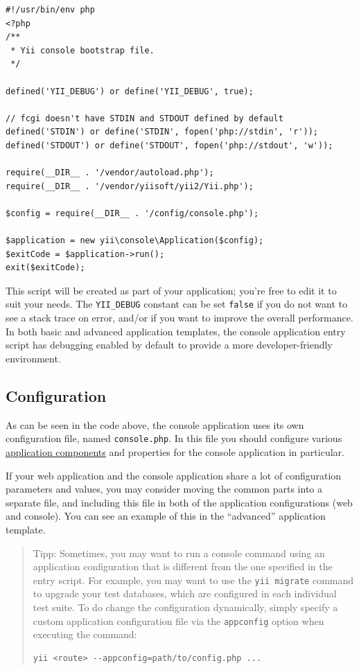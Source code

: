 \lstset{language=php}\begin{lstlisting}
#!/usr/bin/env php
<?php
/**
 * Yii console bootstrap file.
 */

defined('YII_DEBUG') or define('YII_DEBUG', true);

// fcgi doesn't have STDIN and STDOUT defined by default
defined('STDIN') or define('STDIN', fopen('php://stdin', 'r'));
defined('STDOUT') or define('STDOUT', fopen('php://stdout', 'w'));

require(__DIR__ . '/vendor/autoload.php');
require(__DIR__ . '/vendor/yiisoft/yii2/Yii.php');

$config = require(__DIR__ . '/config/console.php');

$application = new yii\console\Application($config);
$exitCode = $application->run();
exit($exitCode);
\end{lstlisting}
This script will be created as part of your application; you're free to edit it to suit your needs. The \lstinline|YII_DEBUG| constant can be set \lstinline|false| if you do
not want to see a stack trace on error, and/or if you want to improve the overall performance. In both basic and advanced application
templates, the console application entry script has debugging enabled by default to provide a more developer-friendly environment.

\subsection{Configuration \label{tutorial-console.md::configuration}}
As can be seen in the code above, the console application uses its own configuration file, named \lstinline|console.php|. In this file
you should configure various \hyperref[structure-application-components.md]{application components} and properties for the console application in particular.

If your web application and the console application share a lot of configuration parameters and values, you may consider moving the common
parts into a separate file, and including this file in both of the application configurations (web and console). You can see an example of this in the ``advanced'' application template.

\begin{quote}Tipp: Sometimes, you may want to run a console command using an application configuration that is different
from the one specified in the entry script. For example, you may want to use the \lstinline|yii migrate| command to
upgrade your test databases, which are configured in each individual test suite. To do change the configuration
dynamically, simply specify a custom application configuration
file via the \lstinline|appconfig| option when executing the command:

\begin{lstlisting}
yii <route> --appconfig=path/to/config.php ...
\end{lstlisting}
\end{quote}
